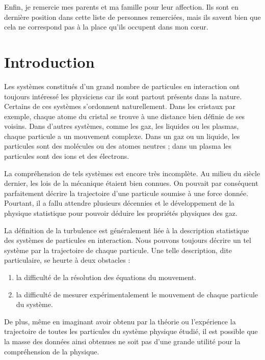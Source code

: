 \documentclass{book}
\begin{document}
Enfin, je remercie mes parents et ma famille pour leur affection. Ils
sont en derni\`ere position dans cette liste de personnes
remerci\'ees, mais ils savent bien que cela ne correspond pas \`a la
place qu'ils occupent dans mon c\oe ur.



\chapter*{Introduction}


Les syst\`emes constitu\'es d'un  grand nombre de particules en
interaction ont toujours int\'eress\'e les physiciens car ils sont
partout pr\'esents dans la nature.
Certains de ces syst\`emes s'ordonnent naturellement. Dans les cristaux
par exemple, chaque atome du cristal se trouve \`a une distance bien
d\'efinie de ses voisins. Dans d'autres syst\`emes, comme les gaz, les
liquides ou les plasmas, chaque particule a un mouvement complexe.
Dans un gaz ou un liquide, les
particules sont des mol\'ecules ou des atomes neutres ; dans un plasma
les particules sont des  ions et des \'electrons.

La compr\'ehension de tels syst\`emes est encore tr\`es incompl\`ete. Au
milieu du si\`ecle dernier, les lois de la m\'ecanique \'etaient bien
connues. On pouvait par cons\'equent parfaitement d\'ecrire la trajectoire
d'une particule soumise \`a une force donn\'ee. Pourtant, il a fallu
attendre plusieurs d\'ecennies et le d\'eveloppement de la physique
statistique pour pouvoir d\'eduire les propri\'et\'es physiques des gaz.

La d\'efinition de la turbulence est
g\'en\'eralement li\'ee \`a la description 
statistique des syst\`emes de particules en interaction. Nous pouvons
toujours d\'ecrire un tel syst\`eme par la trajectoire de
chaque 
particule. Une telle description, dite
particulaire, se heurte \`a deux 
obstacles :

\begin{enumerate}
\item la difficult\'e de la r\'esolution des \'equations du mouvement.
\item la difficult\'e de mesurer exp\'erimentalement le mouvement de
chaque particule du syst\`eme.
\end{enumerate}

De plus, m\^eme en imaginant avoir obtenu par la th\'eorie ou
l'exp\'erience 
la trajectoire de toutes les particules du syst\`eme physique
\'etudi\'e, il 
est possible que la masse des donn\'ees ainsi obtenues ne soit pas
d'une grande utilit\'e pour la compr\'ehension de la physique.
\end{document}
